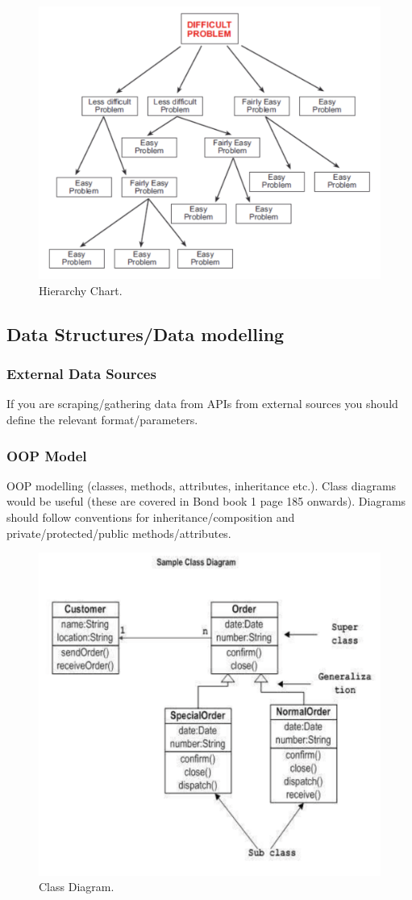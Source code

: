 \documentclass{article}
\begin{document}
\begin{figure}[!ht]
    \centering
    \includegraphics[width = 0.5\linewidth]{hierarchy_chart.png}
    \caption{Hierarchy Chart.}
    \label{fig:hierarchy}
\end{figure}

\subsection{Data Structures/Data modelling}
\subsubsection{External Data Sources}
If you are scraping/gathering data from APIs from external sources you should define the relevant format/parameters.

\subsubsection{OOP Model}
OOP modelling (classes, methods, attributes, inheritance etc.). Class diagrams would be useful (these are covered in Bond book 1 page 185 onwards). Diagrams should follow conventions for inheritance/composition and private/protected/public methods/attributes.

\begin{figure}[!ht]
    \centering
    \includegraphics[width = 0.5\linewidth]{class_diagram.png}
    \caption{Class Diagram.}
    \label{fig:classes}
\end{figure}
\end{document}
